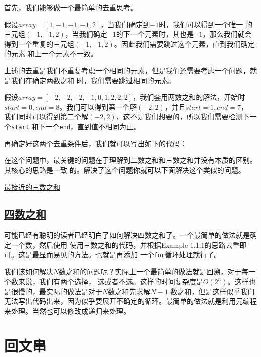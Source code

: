 \documentclass[../../main.tex]{subfiles}
\begin{document}
首先，我们能够做一个最简单的去重思考。

\begin{example}
  假设$array = [1, -1, -1, -1, 2]$，当我们确定到$-1$时，我们可以得到一个唯一
  的三元组$(-1, -1, 2)$，当我们确定$-1$的下一个元素时，其也是$-1$，那么我们就会
  得到一个重复的三元组$(-1, -1, 2)$。因此我们需要跳过这个元素，直到我们确定的元素
  和上一个元素不一致。
\end{example}

上述的去重是我们不重复考虑一个相同的元素，但是我们还需要考虑一个问题，就是我们在确定两数之和
时，我们需要跳过相同的元素。

\begin{example}
  假设$array = [-2, -2, -2, -1, 0, 1, 2, 2, 2]$，我们套用两数之和的解法，开始时
  $start = 0, end = 8$。我们可以得到第一个解$(-2, 2)$，并且$start = 1, end = 7$，
  我们同时可以得到第二个解$(-2, 2)$，这不是我们想要的，所以我们需要检测下一个\verb|start|
  和下一个\verb|end|，直到值不相同为止。
\end{example}

再确定好这两个去重条件后，我们就可以写出如下的代码：



在这个问题中，最关键的问题在于理解到二数之和和三数之和并没有本质的区别。其核心的思路是一致
的。解决了这个问题你就可以下面解决这个类似的问题。

\href{https://leetcode.cn/problems/3sum-closest/}{最接近的三数之和
}

\subsection{\href{https://leetcode-cn.com/problems/4sum}{四数之和}}

可能已经有聪明的读者已经明白了如何解决四数之和了。一个最简单的做法就是确定一个数，然后使用
使用三数之和的代码，并根据Example 1.1.1的思路去重即可。这是最显而易见的方法。也就是再添加
一个\verb|for|循环处理就行了。

\begin{kaobox}[title=思考]
我们该如何解决$N$数之和的问题呢？实际上一个最简单的做法就是回溯，对于每一个数来说，我们有两个选择，
选或者不选。这样的时间复杂度是$O(2^n)$。这样也是很慢的，最实际的做法是对于$N$数之和先求解$N-1$
数之和，但是这样似乎我们无法写出代码出来，因为似乎要展开不确定的循环。最简单的做法就是利用元编程
来处理。当然也可以修改成递归来处理。
\end{kaobox}

\section{回文串}
\end{document}
